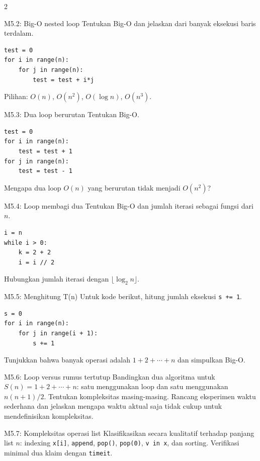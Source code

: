 \documentclass[9pt,a4paper]{article}
\begin{document}
\begin{multicols}{2}
\begin{qbox}[L2]{M5.2: Big-O nested loop}
Tentukan Big-O dan jelaskan dari banyak eksekusi baris terdalam.
\begin{lstlisting}
test = 0
for i in range(n):
    for j in range(n):
        test = test + i*j
\end{lstlisting}
Pilihan: $O(n)$, $O(n^2)$, $O(\log n)$, $O(n^3)$.
\end{qbox}

\begin{qbox}[L2]{M5.3: Dua loop berurutan}
Tentukan Big-O.
\begin{lstlisting}
test = 0
for i in range(n):
    test = test + 1
for j in range(n):
    test = test - 1
\end{lstlisting}
Mengapa dua loop $O(n)$ yang berurutan tidak menjadi $O(n^2)$?
\end{qbox}

\begin{qbox}[L2]{M5.4: Loop membagi dua}
Tentukan Big-O dan jumlah iterasi sebagai fungsi dari $n$.
\begin{lstlisting}
i = n
while i > 0:
    k = 2 + 2
    i = i // 2
\end{lstlisting}
Hubungkan jumlah iterasi dengan $\lfloor\log_2 n\rfloor$.
\end{qbox}

\begin{qbox}[L3]{M5.5: Menghitung T(n)}
Untuk kode berikut, hitung jumlah eksekusi \texttt{s += 1}.
\begin{lstlisting}
s = 0
for i in range(n):
    for j in range(i + 1):
        s += 1
\end{lstlisting}
Tunjukkan bahwa banyak operasi adalah $1+2+\cdots+n$ dan simpulkan Big-O.
\end{qbox}

\begin{qbox}[L3]{M5.6: Loop versus rumus tertutup}
Bandingkan dua algoritma untuk $S(n)=1+2+\cdots+n$: satu menggunakan loop dan satu menggunakan $n(n+1)/2$. Tentukan kompleksitas masing-masing. Rancang eksperimen waktu sederhana dan jelaskan mengapa waktu aktual saja tidak cukup untuk mendefinisikan kompleksitas.
\end{qbox}

\begin{qbox}[L3]{M5.7: Kompleksitas operasi list}
Klasifikasikan secara kualitatif terhadap panjang list $n$: indexing \texttt{x[i]}, \texttt{append}, \texttt{pop()}, \texttt{pop(0)}, \texttt{v in x}, dan sorting. Verifikasi minimal dua klaim dengan \texttt{timeit}.
\end{qbox}


\end{multicols}
\end{document}
